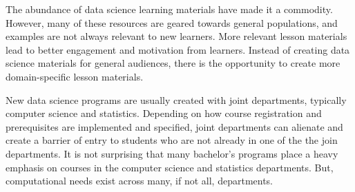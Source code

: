 \documentclass[020-persona\_validation.tex]{subfiles}
\begin{document}


    The abundance of data science learning materials have made it a commodity.
    However, many of these resources are geared towards general populations,
    and examples are not always relevant to new learners.
    More relevant lesson materials lead to better engagement and motivation from learners.
    Instead of creating data science materials for general audiences,
    there is the opportunity to create more domain-specific lesson materials.


    New data science programs are usually created with joint departments,
    typically computer science and statistics.
    Depending on how course registration and prerequisites are implemented and specified,
    joint departments can alienate and create a barrier of entry to students who are not already
    in one of the the join departments.
    It is not surprising that many bachelor's programs place a heavy emphasis on
    courses in the computer science and statistics departments.
    But, computational needs exist across many, if not all, departments.
\end{document}
